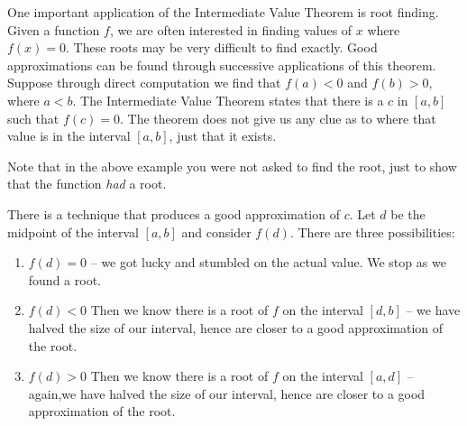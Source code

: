 

One important application of the Intermediate Value Theorem is root finding. Given a function $f$, we are often interested in finding values of $x$ where $f(x) = 0$. These roots may be very difficult to find exactly. Good approximations can be found through successive applications of this theorem. Suppose through direct computation we find that $f(a) <0 $ and $f(b)>0$, where $a<b$. The Intermediate Value Theorem states that there is a $c$ in $[a,b]$ such that $f(c) = 0$. The theorem does not give us any clue as to where that value is in the interval $[a,b]$, just that it exists. 


Note that in the above example you were not asked to find the root, just to show that the function \emph{had} a root. %

There is a technique that produces a good approximation of $c$. Let $d$ be the midpoint of the interval $[a,b]$ and consider $f(d)$. There are three possibilities:
\begin{enumerate}
	\item	$f(d) = 0$ -- we got lucky and stumbled on the actual value. We stop as we found a root.
	\item	$f(d) <0$ Then we know there is a root of $f$ on the interval $[d,b]$ -- we have halved the size of our interval, hence are closer to a good approximation of the root.
	\item	$f(d) >0$ Then we know there is a root of $f$ on the interval $[a,d]$ -- again,we have halved the size of our interval, hence are closer to a good approximation of the root.
\end{enumerate}


